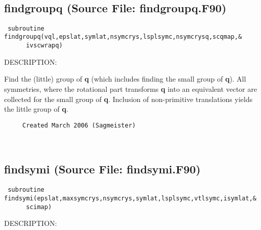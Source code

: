 \documentclass[11pt]{article}
\begin{document}
 
 
\mbox{}\hrulefill\ 
 
\subsection{findgroupq (Source File: findgroupq.F90)}


\begin{verbatim} subroutine findgroupq(vql,epslat,symlat,nsymcrys,lsplsymc,nsymcrysq,scqmap,&
      ivscwrapq)\end{verbatim}
{\sf DESCRIPTION:\\ }


     Find the (little) group of {\bf q} (which includes finding the small group
     of {\bf q}).
     All symmetries, where the rotational part transforms {\bf q} into an
     equivalent vector are collected for the small group of {\bf q}. Inclusion
     of non-primitive translations yields the little group of {\bf q}.
  
\begin{verbatim}     Created March 2006 (Sagmeister)\end{verbatim}








 
 
\mbox{}\hrulefill\ 
 
\subsection{findsymi (Source File: findsymi.F90)}


\begin{verbatim} subroutine findsymi(epslat,maxsymcrys,nsymcrys,symlat,lsplsymc,vtlsymc,isymlat,&
      scimap)\end{verbatim}
{\sf DESCRIPTION:\\ }
\end{document}
